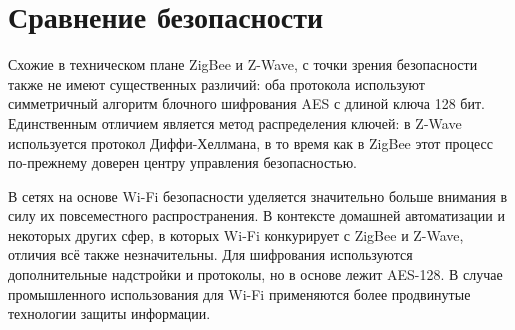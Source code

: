 	
	\section{Сравнение безопасности}
	Схожие в техническом плане ZigBee и Z-Wave, с точки зрения безопасности также не имеют
	существенных различий: оба протокола используют симметричный алгоритм блочного шифрования
	AES с длиной ключа 128 бит. Единственным отличием является метод распределения ключей: в Z-Wave
	используется протокол Диффи-Хеллмана, в то время как в ZigBee этот процесс по-прежнему доверен
	центру управления безопасностью.
	
	В сетях на основе Wi-Fi безопасности уделяется значительно больше внимания в силу их повсеместного
	распространения. В контексте домашней автоматизации и некоторых других сфер, в которых Wi-Fi
	конкурирует с ZigBee и Z-Wave, отличия всё также незначительны. Для шифрования используются
	дополнительные надстройки и протоколы, но в основе лежит AES-128. В случае промышленного
	использования для Wi-Fi применяются более продвинутые технологии защиты информации.
	